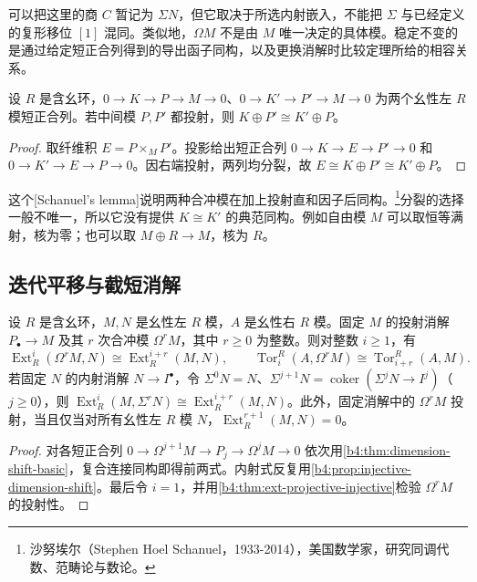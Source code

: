 可以把这里的商 \(C\) 暂记为 \(\Sigma N\)，但它取决于所选内射嵌入，不能把 \(\Sigma\) 与已经定义的复形移位 \([1]\) 混同。类似地，\(\Omega M\) 不是由 \(M\) 唯一决定的具体模。稳定不变的是通过给定短正合列得到的导出函子同构，以及更换消解时比较定理所给的相容关系。

\begin{lemma}[Schanuel 引理]\label{b4:lem:schanuel}
设 \(R\) 是含幺环，\(0\to K\to P\to M\to0\)、\(0\to K'\to P'\to M\to0\) 为两个幺性左 \(R\) 模短正合列。若中间模 \(P,P'\) 都投射，则 \(K\oplus P'\cong K'\oplus P\)。
\end{lemma}
\begin{proof}
取纤维积 \(E=P\times_M P'\)。投影给出短正合列 \(0\to K\to E\to P'\to0\) 和 \(0\to K'\to E\to P\to0\)。因右端投射，两列均分裂，故 \(E\cong K\oplus P'\cong K'\oplus P\)。
\end{proof}

这个[Schanuel's lemma]说明两种合冲模在加上投射直和因子后同构。\footnote{沙努埃尔（Stephen Hoel Schanuel，1933-2014），美国数学家，研究同调代数、范畴论与数论。}分裂的选择一般不唯一，所以它没有提供 \(K\cong K'\) 的典范同构。例如自由模 \(M\) 可以取恒等满射，核为零；也可以取 \(M\oplus R\to M\)，核为 \(R\)。

\subsection{迭代平移与截短消解}
\label{b4:subsec:0805:03}

\begin{proposition}\label{b4:prop:iterated-dimension-shift}
设 \(R\) 是含幺环，\(M,N\) 是幺性左 \(R\) 模，\(A\) 是幺性右 \(R\) 模。固定 \(M\) 的投射消解 \(P_\bullet\to M\) 及其 \(r\) 次合冲模 \(\Omega^rM\)，其中 \(r\ge0\) 为整数。则对整数 \(i\ge1\)，有
\[
\operatorname{Ext}_R^i(\Omega^rM,N)\cong\operatorname{Ext}_R^{i+r}(M,N),
\qquad
\operatorname{Tor}_i^R(A,\Omega^rM)\cong\operatorname{Tor}_{i+r}^R(A,M).
\]
若固定 \(N\) 的内射消解 \(N\to I^\bullet\)，令 \(\Sigma^0N=N\)、\(\Sigma^{j+1}N=\operatorname{coker}(\Sigma^jN\to I^j)\)（\(j\ge0\)），则 \(\operatorname{Ext}_R^i(M,\Sigma^rN)\cong\operatorname{Ext}_R^{i+r}(M,N)\)。此外，固定消解中的 \(\Omega^rM\) 投射，当且仅当对所有幺性左 \(R\) 模 \(N\)，\(\operatorname{Ext}_R^{r+1}(M,N)=0\)。
\end{proposition}
\begin{proof}
对各短正合列 \(0\to\Omega^{j+1}M\to P_j\to\Omega^jM\to0\) 依次用\cref{b4:thm:dimension-shift-basic}，复合连接同构即得前两式。内射式反复用\cref{b4:prop:injective-dimension-shift}。最后令 \(i=1\)，并用\cref{b4:thm:ext-projective-injective}检验 \(\Omega^rM\) 的投射性。
\end{proof}


